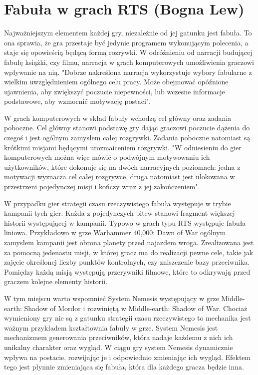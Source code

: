 \section{Fabuła w grach RTS (Bogna Lew)}\label{s:fabuła}
Najważniejszym elementem każdej gry, niezależnie od jej gatunku jest fabuła. To ona sprawia, że gra przestaje być
jedynie programem wykonującym polecenia, a staje się opowieścią będącą formą rozrywki. W odróżnieniu od narracji budującej
fabułę książki, czy filmu, narracja w grach komputerowych umożliwienia graczowi wpływanie na nią. "Dobrze nakreślona
narracja wykorzystuje wybory fabularne z wielkim uwzględnieniem ogólnego celu pracy. Może obejmować opóźnione ujawnienia,
aby zwiększyć poczucie niepewności, lub wczesne informacje podstawowe, aby wzmocnić motywację postaci"\cite{level_design}.

W grach komputerowych w skład fabuły wchodzą cel główny oraz zadania poboczne. Cel główny stanowi podstawę gry dając
graczowi poczucie dążenia do czegoś i jest ogólnym zamysłem całej rozgrywki. Zadania poboczne natomiast są krótkimi
misjami będącymi urozmaiceniem rozgrywki. "W odniesieniu do gier komputerowych można więc mówić o podwójnym motywowaniu
ich użytkowników, które dokonuje się na dwóch narracyjnych poziomach: jedna z motywacji wyznacza cel całej
rozgrywce, druga natomiast jest ulokowana w przestrzeni pojedynczej misji i kończy wraz z jej zakończeniem"\cite{olbrzymwcieniu}.

W przypadku gier strategii czasu rzeczywistego fabuła występuje w trybie kampanii tych gier. Każda z pojedynczych bitew
stanowi fragment większej historii występującej w kampanii. Typowo w grach typu RTS występuje fabuła liniowa.
Przykładowo w grze Warhammer 40,000: Dawn of War ogólnym zamysłem kampanii jest obrona planety przed najazdem wroga.
Zrealizowana jest za pomocną jedenastu misji, w której gracz ma do realizacji pewne cele, takie jak zajęcie określonej
liczby punktów kontrolnych, czy zniszczenie bazy przeciwnika. Pomiędzy każdą misją występują przerywniki filmowe, które
to odkrywają przed graczem kolejne elementy historii.

W tym miejscu warto wspomnieć System Nemesis występujący w grze Middle-earth: Shadow of Mordor i rozwiniętą w
Middle-earth: Shadow of War. Chociaż wymieniony gry nie są z gatunku strategii czasu rzeczywistego to mechanika jest
ważnym przykładem kształtownia fabuły w grze. System Nemesis jest mechanizmem generowania przeciwników, która nadaje
każdemu z nich ich unikalny charakter oraz wygląd. W ciągu gry system Nemesis dynamicznie wpływa na postacie, rozwijając
je i odpowiednio zmieniając ich wygląd. Efektem tego jest płynnie zmieniająca się fabuła, która dla każdego gracza
będzie inna.

